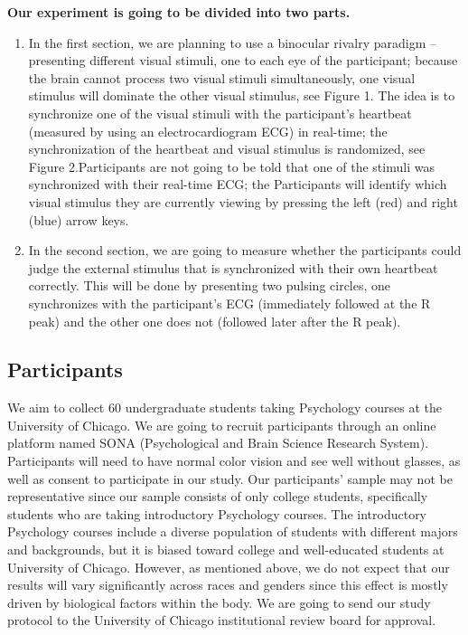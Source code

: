 \documentclass[
  man]{apa6}
\begin{document}
\textbf{Our experiment is going to be divided into two parts.}

\begin{enumerate}
\def\labelenumi{\arabic{enumi}.}
\item
  In the first section, we are planning to use a binocular rivalry paradigm -- presenting different visual stimuli, one to each eye of the participant; because the brain cannot process two visual stimuli simultaneously, one visual stimulus will dominate the other visual stimulus, see Figure 1. The idea is to synchronize one of the visual stimuli with the participant's heartbeat (measured by using an electrocardiogram ECG) in real-time; the synchronization of the heartbeat and visual stimulus is randomized, see Figure 2.Participants are not going to be told that one of the stimuli was synchronized with their real-time ECG; the Participants will identify which visual stimulus they are currently viewing by pressing the left (red) and right (blue) arrow keys.
\item
  In the second section, we are going to measure whether the participants could judge the external stimulus that is synchronized with their own heartbeat correctly. This will be done by presenting two pulsing circles, one synchronizes with the participant's ECG (immediately followed at the R peak) and the other one does not (followed later after the R peak).
\end{enumerate}

\hypertarget{participants}{%
\subsection{Participants}\label{participants}}

We aim to collect 60 undergraduate students taking Psychology courses at the University of Chicago. We are going to recruit participants through an online platform named SONA (Psychological and Brain Science Research System). Participants will need to have normal color vision and see well without glasses, as well as consent to participate in our study. Our participants' sample may not be representative since our sample consists of only college students, specifically students who are taking introductory Psychology courses. The introductory Psychology courses include a diverse population of students with different majors and backgrounds, but it is biased toward college and well-educated students at University of Chicago. However, as mentioned above, we do not expect that our results will vary significantly across races and genders since this effect is mostly driven by biological factors within the body. We are going to send our study protocol to the University of Chicago institutional review board for approval.
\end{document}
